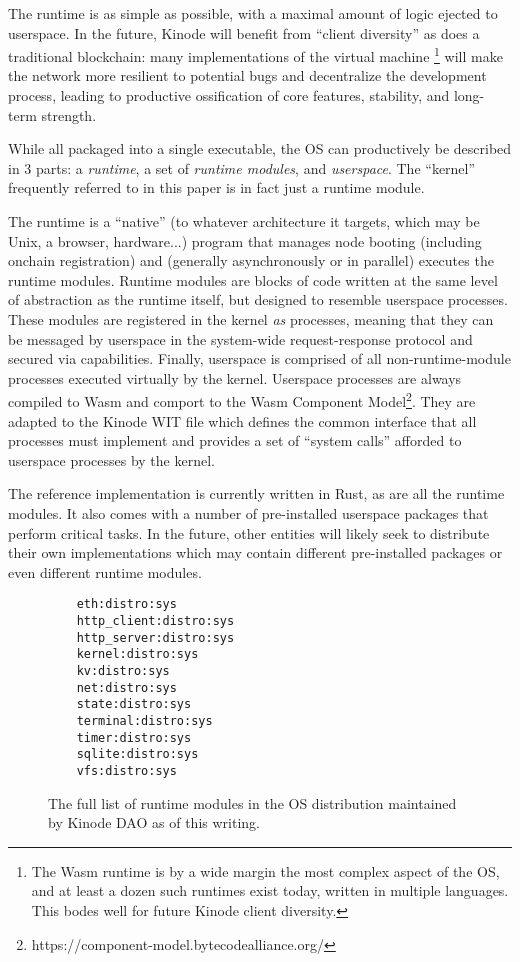 \documentclass[runningheads]{llncs}
\begin{document}
The runtime is as simple as possible, with a maximal amount of logic ejected to userspace.
In the future, Kinode will benefit from ``client diversity'' as does a traditional blockchain: many implementations of the virtual machine
\footnote{The Wasm runtime is by a wide margin the most complex aspect of the OS, and at least a dozen such runtimes exist today, written in multiple languages.
This bodes well for future Kinode client diversity.}
will make the network more resilient to potential bugs and decentralize the development process, leading to productive ossification of core features, stability, and long-term strength.

While all packaged into a single executable, the OS can productively be described in 3 parts: a \textit{runtime}, a set of \textit{runtime modules}, and \textit{userspace}.
The ``kernel'' frequently referred to in this paper is in fact just a runtime module.

The runtime is a ``native'' (to whatever architecture it targets, which may be Unix, a browser, hardware...) program that manages node booting (including onchain registration) and (generally asynchronously or in parallel) executes the runtime modules.
Runtime modules are blocks of code written at the same level of abstraction as the runtime itself, but designed to resemble userspace processes.
These modules are registered in the kernel \textit{as} processes, meaning that they can be messaged by userspace in the system-wide request-response protocol and secured via capabilities.
Finally, userspace is comprised of all non-runtime-module processes executed virtually by the kernel.
Userspace processes are always compiled to Wasm and comport to the Wasm Component Model\footnote{https://component-model.bytecodealliance.org/}.
They are adapted to the Kinode WIT file which defines the common interface that all processes must implement and provides a set of ``system calls'' afforded to userspace processes by the kernel.

The reference implementation is currently written in Rust, as are all the runtime modules.
It also comes with a number of pre-installed userspace packages that perform critical tasks.
In the future, other entities will likely seek to distribute their own implementations which may contain different pre-installed packages or even different runtime modules.

\begin{figure}
    \centering
    \begin{lstlisting}
    eth:distro:sys
    http_client:distro:sys
    http_server:distro:sys
    kernel:distro:sys
    kv:distro:sys
    net:distro:sys
    state:distro:sys
    terminal:distro:sys
    timer:distro:sys
    sqlite:distro:sys
    vfs:distro:sys
    \end{lstlisting}
    \caption{The full list of runtime modules in the OS distribution maintained by Kinode DAO as of this writing.}
    \label{fig:runtime modules list}
\end{figure}
\end{document}
